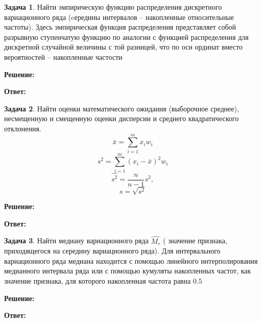 \documentclass[a4paper,12pt]{article}
\theoremstyle{definition}
\newtheorem{problem}{Задача}
\newenvironment{solution}
{\begin{shaded}\textbf{Решение:}\par}
{\end{shaded}}
\newenvironment{answer}
{\par\noindent\textbf{Ответ:} \color{blue}}
{\par}
\begin{document}
\vspace{8pt}
\begin{problem}
    Найти эмпирическую функцию распределения дискретного вариационного ряда
    (cередины интервалов – накопленные относительные частоты).
    Здесь эмпирическая функция распределения представляет собой разрывную
    ступенчатую функцию по аналогии с функцией распределения для дискретной
    случайной величины с той разницей, что по оси ординат вместо вероятностей –
    накопленные частости
    
        \begin{solution}
        \end{solution}
    
        \begin{answer}
        \end{answer}
    
    \end{problem}



\vspace{8pt}
\begin{problem}
    Найти оценки математического ожидания (выборочное среднее), несмещенную и
    смещенную оценки дисперсии и среднего квадратического отклонения.
    \[\bar{x} = \sum^m_{i=1} x_i w_i\]
    \[s^2 = \sum^m_{i=1}(x_i - \bar{x})^2 w_i\]
    \[\hat{s^2} = \frac{n}{n-1} s^2, \]
    \[s = \sqrt{s^2}\]
    
        \begin{solution}
        \end{solution}
    
        \begin{answer}
        \end{answer}
    
    \end{problem}


\vspace{8pt}
\begin{problem}
    Найти медиану вариационного ряда \(\hat{M_e}\) ( значение признака, приходящегося на
    середину вариационного ряда). Для интервального вариационного ряда медиана
    находится с помощью линейного интерполирования медианного интервала ряда
    или с помощью кумуляты накопленных частот, как значение признака, для
    которого накопленная частота равна \(0.5\)
    
        \begin{solution}
        \end{solution}
    
        \begin{answer}
        \end{answer}
    
    \end{problem}
\end{document}
